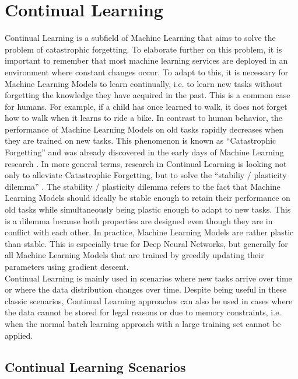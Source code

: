 \section{Continual Learning}
\label{sec:ContinualLearning}
Continual Learning is a subfield of Machine Learning that aims to solve the problem of catastrophic forgetting. To elaborate further on this problem,
it is important to remember that most machine learning services are deployed in an environment where constant changes occur. To adapt to this, it is
necessary for Machine Learning Models to learn continually, i.e. to learn new tasks without forgetting the knowledge they have acquired in the past.
This is a common case for humans. For example, if a child has once learned to walk, it does not forget how to walk when it learns to ride a bike.
In contrast to human behavior, the performance of Machine Learning Models on old tasks rapidly decreases when they are trained on new tasks. This phenomenon
is known as \enquote{Catastrophic Forgetting} and was already discovered in the early days of Machine Learning research \cite{mccloskey1989catastrophic}.
In more general terms, research in Continual Learning is looking not only to alleviate Catastrophic Forgetting, but to solve the 
\enquote{stabiliy / plasticity dilemma} \cite{carpenter1988art}. The stability / plasticity dilemma refers to the fact that Machine Learning Models
should ideally be stable enough to retain their performance on old tasks while simultaneously being plastic enough to adapt to new tasks. This is a dilemma
because both properties are designed even though they are in conflict with each other. In practice, Machine Learning Models are rather plastic than stable.
This is especially true for Deep Neural Networks, but generally for all Machine Learning Models that are trained by greedily updating their parameters using
gradient descent. \\
Continual Learning is mainly used in scenarios where new tasks arrive over time or where the data distribution changes over time. Despite being useful
in these classic scenarios, Continual Learning approaches can also be used in cases where the data cannot be stored for legal reasons or due to memory
constraints, i.e. when the normal batch learning approach with a large training set cannot be applied. 


\subsection{Continual Learning Scenarios}
\label{sec:ContinualLearningScenarios}

